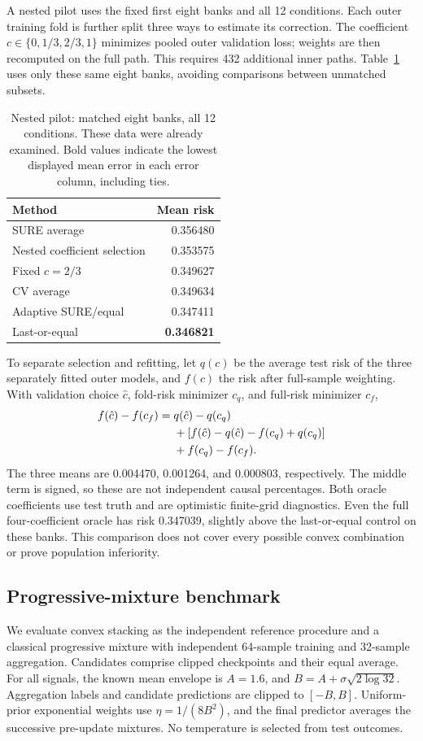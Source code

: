 \documentclass[pdflatex,sn-mathphys-ay]{sn-jnl}
\theoremstyle{remark}\newtheorem{remark}[theorem]{Remark}
\begin{document}
A nested pilot uses the fixed first eight banks and all 12 conditions. Each outer training fold is further split three ways to estimate its correction. The coefficient $c\in\{0,1/3,2/3,1\}$ minimizes pooled outer validation loss; weights are then recomputed on the full path. This requires 432 additional inner paths. Table~\ref{tab:nested} uses only these same eight banks, avoiding comparisons between unmatched subsets.

\begin{table}[t]\centering\small
\caption{Nested pilot: matched eight banks, all 12 conditions. These data were already examined. Bold values indicate the lowest displayed mean error in each error column, including ties.}\label{tab:nested}
\begin{tabular}{lr}\toprule Method & Mean risk\\\midrule
SURE average & 0.356480\\
Nested coefficient selection & 0.353575\\
Fixed $c=2/3$ & 0.349627\\
CV average & 0.349634\\
Adaptive SURE/equal & 0.347411\\
Last-or-equal & \textbf{0.346821}\\\bottomrule
\end{tabular}\end{table}

To separate selection and refitting, let $q(c)$ be the average test risk of the three separately fitted outer models, and $f(c)$ the risk after full-sample weighting. With validation choice $\hat c$, fold-risk minimizer $c_q$, and full-risk minimizer $c_f$,
\begin{align}
 f(\hat c)-f(c_f)={}&q(\hat c)-q(c_q)\notag\\
 &+[f(\hat c)-q(\hat c)-f(c_q)+q(c_q)]\notag\\
 &+f(c_q)-f(c_f).\label{eq:decomp}
\end{align}
The three means are 0.004470, 0.001264, and 0.000803, respectively. The middle term is signed, so these are not independent causal percentages. Both oracle coefficients use test truth and are optimistic finite-grid diagnostics. Even the full four-coefficient oracle has risk 0.347039, slightly above the last-or-equal control on these banks. This comparison does not cover every possible convex combination or prove population inferiority.


\subsection{Progressive-mixture benchmark}
We evaluate convex stacking as the independent reference procedure and a classical progressive mixture with independent 64-sample training and 32-sample aggregation. Candidates comprise clipped checkpoints and their equal average. For all signals, the known mean envelope is $A=1.6$, and $B=A+\sigma\sqrt{2\log32}$. Aggregation labels and candidate predictions are clipped to $[-B,B]$. Uniform-prior exponential weights use $\eta=1/(8B^2)$, and the final predictor averages the successive pre-update mixtures. No temperature is selected from test outcomes.
\end{document}
